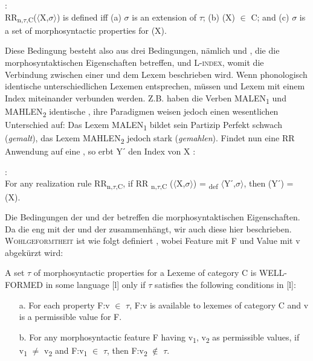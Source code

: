 \ea%
    \label{ex:key:14}
:\\
RR\textsubscript{n,}\textsubscript{$\tau $}\textsubscript{,C}($\langle$X,$\sigma$$\rangle$) is defined iff (a) $\sigma $ is an extension of $\tau $; (b) (X) ${\in}$ C; and (c) $\sigma $ is   a  set of morphosyntactic properties for (X). \citep[45]{Stump2001}
    \glt
    \z
      


Diese Bedingung besteht also aus drei Bedingungen, nämlich  und , die die morphosyntaktischen Eigenschaften betreffen, und \textsc{L-index}, womit die Verbindung zwischen einer  und dem Lexem beschrieben wird. Wenn phonologisch identische  unterschiedlichen Lexemen entsprechen, müssen  und Lexem mit einem Index miteinander verbunden werden. Z.B. haben die Verben MALEN\textsubscript{1} und MAHLEN\textsubscript{2} identische , ihre Paradigmen weisen jedoch einen wesentlichen Unterschied auf: Das Lexem MALEN\textsubscript{1} bildet sein Partizip Perfekt schwach (\textit{gemalt}), das Lexem MAHLEN\textsubscript{2} jedoch stark (\textit{gemahlen}). Findet nun eine RR Anwendung auf eine , so erbt Yˊ den Index von X :

\ea%
    \label{ex:key:15}
:\\
For any realization rule RR\textsubscript{n,}\textsubscript{$\tau $}\textsubscript{,C}, if RR \textsubscript{n,}\textsubscript{$\tau $}\textsubscript{,C} ($\langle$X,$\sigma$$\rangle$) = \textsubscript{def} $\langle$Yˊ,$\sigma$$\rangle$, then (Yˊ) = (X). \citep[45]{Stump2001}
    \z

Die Bedingungen der  und der  betreffen die morphosyntaktischen Eigenschaften. Da die  eng mit der  und der  zusammenhängt, wir auch diese hier beschrieben. \textsc{Wohlgeformtheit} ist wie folgt definiert , wobei Feature mit F und Value mit v abgekürzt wird:

\ea%
    \label{ex:key:16}
A set $\tau $ of morphosyntactic properties for a Lexeme of category C is WELL-FORMED in some language [l] only if $\tau $ satisfies the following conditions in [l]:\\
\begin{itemize}
\item[a.] For each property F:v ${\in}$ $\tau $, F:v is available to lexemes of category C and v is a permissible value for F.
\item[b.] For any morphosyntactic feature F having v\textsubscript{1}, v\textsubscript{2} as permissible values, if v\textsubscript{1} ${\neq}$ v\textsubscript{2} and   F:v\textsubscript{1} ${\in}$ $\tau $, then F:v\textsubscript{2} ${\notin}$ $\tau $. \citep[41]{Stump2001}
\end{itemize}
    \glt
    \z

